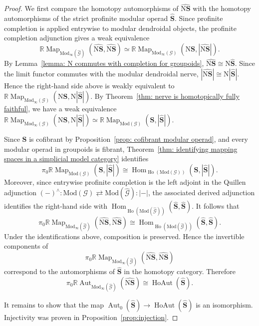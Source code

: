 \documentclass{amsart}
\newcommand{\bS}{\mathbf{S}}
\newcommand{\Grpd}{\mathscr{G}}
\newcommand{\Mod}{\mathrm{Mod}}
\newcommand{\nerve}{\mathrm{N}}
\newcommand{\Hom}{\operatorname{Hom}}
\newcommand{\Ho}{\operatorname{Ho}}
\newcommand{\Aut}{\operatorname{Aut}}
\newcommand{\Map}{\operatorname{Map}}
\newcommand{\HoAut}{\operatorname{HoAut}}
\theoremstyle{definition}
\numberwithin{equation}{section}
\begin{document}
\begin{proof}

We first compare the homotopy automorphisms of $\widehat{\nerve\bS}$ with the homotopy automorphisms of the strict profinite modular operad $\widehat{\bS}$. Since profinite completion is applied entrywise to modular dendroidal objects, the profinite completion adjunction gives a weak equivalence
\[
\mathbb R\Map_{\Mod_{\infty}(\widehat{\Grpd})}
(\widehat{\nerve\bS},\widehat{\nerve\bS})
\simeq
\mathbb R\Map_{\Mod_{\infty}(\Grpd)}
(\nerve\bS,|\widehat{\nerve\bS}|).
\]
By Lemma~\ref{lemma: N commutes with completion for groupoids}, $\widehat{\nerve\bS}\cong \nerve\widehat{\bS}$. Since the limit functor commutes with the modular dendroidal nerve, $|\widehat{\nerve\bS}|\cong \nerve|\widehat{\bS}|$. Hence the right-hand side above is weakly equivalent to $\mathbb R\Map_{\Mod_{\infty}(\Grpd)}
(\nerve\bS,\nerve|\widehat{\bS}|).$  By Theorem~\ref{thm: nerve is homotopically fully faithful}, we have a weak equivalence $\mathbb R\Map_{\Mod_{\infty}(\Grpd)}
(\nerve\bS,\nerve|\widehat{\bS}|)\simeq \mathbb R\Map_{\Mod(\Grpd)}(\bS,|\widehat{\bS}|)$.


Since $\bS$ is cofibrant by Proposition~\ref{prop: cofibrant modular operad}, and every modular operad in groupoids is fibrant, Theorem~\ref{thm: identifying mapping spaces in a simplicial model category} identifies
\[
\pi_0\mathbb R\Map_{\Mod(\Grpd)}(\bS,|\widehat{\bS}|)
\cong
\Hom_{\Ho(\Mod(\Grpd))}(\bS,|\widehat{\bS}|).
\]
Moreover, since entrywise profinite completion is the left adjoint in the Quillen adjunction $(-)^{\wedge}:\Mod(\Grpd)\rightleftarrows \Mod(\widehat{\Grpd}):|-|$, the associated derived adjunction identifies the right-hand side with $\Hom_{\Ho(\Mod(\widehat{\Grpd}))}(\widehat{\bS},\widehat{\bS})$. It follows that
\[
\pi_0\mathbb R\Map_{\Mod_{\infty}(\widehat{\Grpd})}(\widehat{\nerve\bS},\widehat{\nerve\bS}) \cong \Hom_{\Ho(\Mod(\widehat{\Grpd}))}(\widehat{\bS},\widehat{\bS}).
\]
Under the identifications above, composition is preserved. Hence the invertible components of \[\pi_0\mathbb R\Map_{\Mod_{\infty}(\widehat{\Grpd})}(\widehat{\nerve\bS},\widehat{\nerve\bS})\] correspond to the automorphisms of $\widehat{\bS}$ in the homotopy category. Therefore
\[
\pi_0\mathbb R\Aut_{\Mod_{\infty}(\widehat{\Grpd})}(\widehat{\nerve\bS}) \cong \HoAut(\widehat{\bS}).
\]


It remains to show that the map $\Aut_0(\widehat{\bS})\to \HoAut(\widehat{\bS})$ is an isomorphism. Injectivity was proven in Proposition~\ref{prop:injection}. 


\end{proof}
\end{document}
